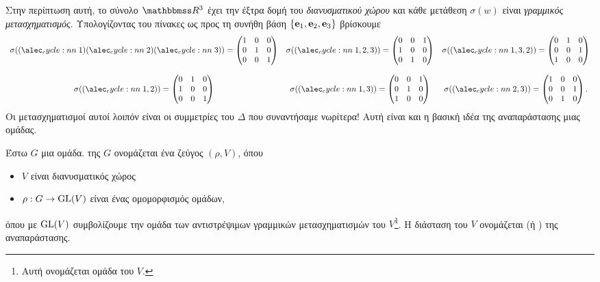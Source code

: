 \documentclass[12pt,a4paper,reqno]{amsart}
\newcommand{\defn}[1]{{\color{mylightblue}{#1}}}
\begin{document}
Στην περίπτωση αυτή, το σύνολο $\RR^3$ έχει την έξτρα δομή του \emph{διανυσματικού χώρου} και κάθε μετάθεση $\sigma(w)$ είναι \emph{γραμμικός μετασχηματισμός}. Υπολογίζοντας του πίνακες ως προς τη συνήθη βάση $\{\mathbf{e}_1, \mathbf{e}_2, \mathbf{e}_3\}$ βρίσκουμε 
\[
\begin{array}{ccc}
    \sigma(\cycle{1}\cycle{2}\cycle{3}) = 
    \begin{pmatrix} 
        1 & 0 & 0 \\ 
        0 & 1 & 0 \\ 
        0 & 0 & 1 
    \end{pmatrix}  
    & \sigma(\cycle{1,2,3}) = 
    \begin{pmatrix} 
        0 & 0 & 1 \\ 
        1 & 0 & 0 \\ 
        0 & 1 & 0 
    \end{pmatrix}
    & \sigma(\cycle{1,3,2}) = 
    \begin{pmatrix} 
        0 & 1 & 0 \\ 
        0 & 0 & 1 \\ 
        1 & 0 & 0 
    \end{pmatrix} \\
     &  &  \\
    \sigma(\cycle{1,2}) =
    \begin{pmatrix} 
        0 & 1 & 0 \\ 
        1 & 0 & 0 \\ 
        0 & 0 & 1 
    \end{pmatrix} 
    & \sigma(\cycle{1,3}) = 
    \begin{pmatrix} 
        0 & 0 & 1 \\ 
        0 & 1 & 0 \\ 
        1 & 0 & 0 
    \end{pmatrix} 
    & \sigma(\cycle{2,3}) = 
    \begin{pmatrix} 
        1 & 0 & 0 \\ 
        0 & 0 & 1 \\ 
        0 & 1 & 0 
    \end{pmatrix}.
\end{array}
\]
Οι μετασχηματισμοί αυτοί λοιπόν είναι οι συμμετρίες του $\Delta$ που συναντήσαμε νωρίτερα! Αυτή είναι και η βασική ιδέα της αναπαράστασης μιας ομάδας.

\begin{definition}
    \label{def:representation}
    Έστω $G$ μια ομάδα. \defn{Αναπαράσταση} της $G$ ονομάζεται ένα ζεύγος $(\rho, V)$, όπου 
    \begin{itemize}
    \item $V$ είναι διανυσματικός χώρος 
    \item $\rho : G \rightarrow \mathrm{GL}(V)$ είναι ένας ομομορφισμός ομάδων, 
    \end{itemize}
    όπου με $\mathrm{GL}(V)$ συμβολίζουμε την ομάδα των αντιστρέψιμων γραμμικών μετασχηματισμών του $V$\footnote{Αυτή ονομάζεται \defn{γενική γραμμική} ομάδα του $V$.}. Η διάσταση του $V$ ονομάζεται \defn{διάσταση} (ή \defn{βαθμός}) της αναπαράστασης.
\end{definition}
\end{document}
